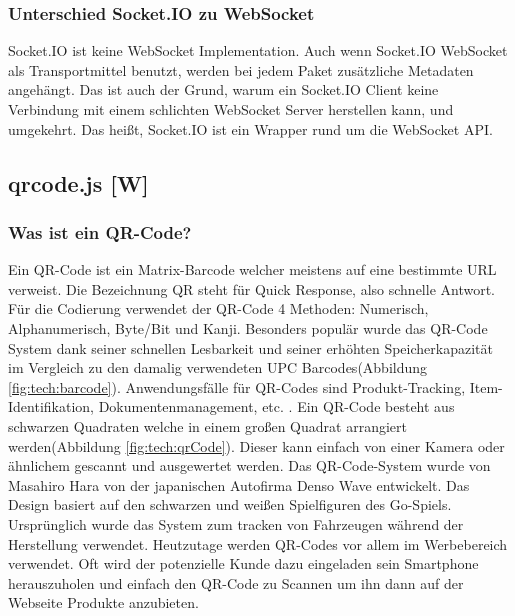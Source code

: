 \subsubsection{Unterschied Socket.IO zu WebSocket}
Socket.IO ist keine WebSocket Implementation. Auch wenn Socket.IO WebSocket als Transportmittel benutzt, werden bei jedem Paket zusätzliche Metadaten angehängt. Das ist auch der Grund, warum
ein Socket.IO Client keine Verbindung mit einem schlichten WebSocket Server herstellen kann, und umgekehrt.
Das heißt, Socket.IO ist ein Wrapper rund um die WebSocket API. \cite{socketio}


\subsection{qrcode.js [W]}

\subsubsection{Was ist ein QR-Code?} 
Ein QR-Code ist ein Matrix-Barcode welcher meistens auf eine bestimmte URL verweist. Die Bezeichnung QR steht für Quick Response,
also schnelle Antwort. Für die Codierung verwendet der QR-Code 4 Methoden: Numerisch, Alphanumerisch, Byte/Bit und Kanji.
Besonders populär wurde das QR-Code System dank seiner
schnellen Lesbarkeit und seiner erhöhten Speicherkapazität im Vergleich zu den
damalig verwendeten UPC Barcodes(Abbildung \ref{fig:tech:barcode}). Anwendungsfälle für QR-Codes sind Produkt-Tracking, Item-Identifikation, Dokumentenmanagement, etc. .
Ein QR-Code besteht aus schwarzen Quadraten welche in einem großen Quadrat arrangiert werden(Abbildung \ref{fig:tech:qrCode}).
Dieser kann einfach von einer Kamera oder ähnlichem gescannt und ausgewertet werden.
Das QR-Code-System wurde von Masahiro Hara von der japanischen Autofirma Denso Wave entwickelt.
Das Design basiert auf den schwarzen und weißen Spielfiguren des Go-Spiels.
Ursprünglich wurde das System zum tracken von Fahrzeugen während der Herstellung verwendet.
Heutzutage werden QR-Codes vor allem im Werbebereich verwendet. Oft wird der
potenzielle Kunde dazu eingeladen  sein Smartphone herauszuholen und einfach den QR-Code zu Scannen um
ihn dann auf der Webseite Produkte anzubieten.\cite{qrCodeWiki}


